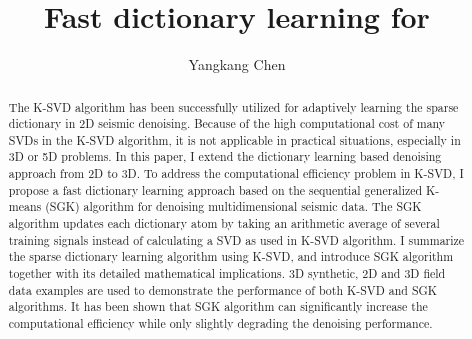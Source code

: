 


\title{Fast dictionary learning for }
\renewcommand{\thefootnote}{\fnsymbol{footnote}}
\author{Yangkang Chen}
\address{
\footnotemark[1]Previously: Bureau of Economic Geology \\
John A. and Katherine G. Jackson School of Geosciences \\
The University of Texas at Austin \\
University Station, Box X \\
Austin, TX 78713-8924 \\
ykchen@utexas.edu \\
Currently: National Center for Computational Sciences \\
Oak Ridge National Laboratory \\
One Bethel Valley Road, \\
Oak Ridge, TN 37831-6008 \\
chenyk2016@gmail.com
}


\maketitle

\begin{abstract}
The K-SVD algorithm has been successfully utilized for adaptively learning the sparse dictionary in 2D seismic denoising. Because of the high computational cost of many SVDs in the K-SVD algorithm, it is not applicable in practical situations, especially in 3D or 5D problems. In this paper, I extend the dictionary learning based denoising approach from 2D to 3D. To address the computational efficiency problem in K-SVD, I propose a fast dictionary learning approach based on the sequential generalized K-means (SGK) algorithm for denoising multidimensional seismic data. The SGK algorithm updates each dictionary atom by taking an arithmetic average of several training signals instead of calculating a SVD as used in K-SVD algorithm. I summarize the sparse dictionary learning algorithm using K-SVD, and introduce SGK algorithm together with its detailed mathematical implications. 3D synthetic, 2D and 3D field data examples are used to demonstrate the performance of both K-SVD and SGK algorithms. It has been shown that SGK algorithm can significantly increase the computational efficiency while only slightly degrading the denoising performance. 
\end{abstract}


